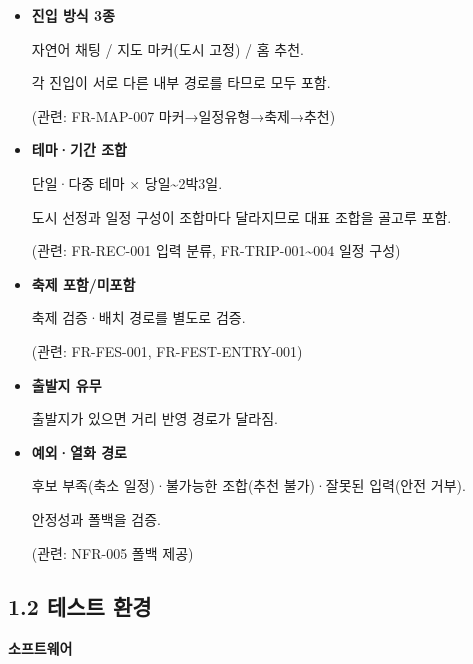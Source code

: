 \documentclass[12pt,a4paper]{article}
\newcommand{\DocNeedspace}[1]{\par\ifdim\dimexpr\pagegoal-\pagetotal\relax<#1\newpage\fi}
\providecommand{\tightlist}{\setlength{\itemsep}{0pt}\setlength{\parskip}{0pt}}
\begin{document}
\begin{itemize}
\tightlist
\item
  \textbf{진입 방식 3종}\par\noindent
  자연어 채팅 / 지도 마커(도시 고정) / 홈 추천.\par\noindent
  각 진입이 서로 다른 내부 경로를 타므로 모두 포함.\par\noindent
  (관련: FR-MAP-007 마커→일정유형→축제→추천)
\item
  \textbf{테마·기간 조합}\par\noindent
  단일·다중 테마 × 당일\textasciitilde{}2박3일.\par\noindent
  도시 선정과 일정 구성이 조합마다 달라지므로 대표 조합을 골고루 포함.\par\noindent
  (관련: FR-REC-001 입력 분류, FR-TRIP-001\textasciitilde004 일정 구성)
\item
  \textbf{축제 포함/미포함}\par\noindent
  축제 검증·배치 경로를 별도로 검증.\par\noindent
  (관련: FR-FES-001, FR-FEST-ENTRY-001)
\item
  \textbf{출발지 유무}\par\noindent
  출발지가 있으면 거리 반영 경로가 달라짐.
\item
  \textbf{예외·열화 경로}\par\noindent
  후보 부족(축소 일정)·불가능한 조합(추천 불가)·잘못된 입력(안전 거부).\par\noindent
  안정성과 폴백을 검증.\par\noindent
  (관련: NFR-005 폴백 제공)
\end{itemize}

\newpage
\DocNeedspace{18\baselineskip}
\subsection*{1.2 테스트 환경}

\textbf{소프트웨어}
\end{document}
